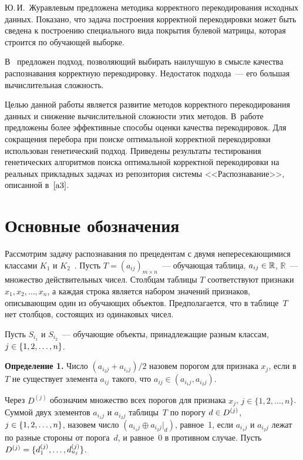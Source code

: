 \begin{multicols}{2}
Ю.\,И.~Журавлевым предложена методика корректного перекодирования
исходных данных. Показано, что задача построения корректной
перекодировки может быть сведена к построению специаль\-но\-го вида
покрытия булевой матрицы, которая строится по обучающей выборке. 

В~\cite{a1,a2} предложен подход, позволяющий выбирать наилучшую в
смысле качества распознавания корректную перекодировку. Недостаток
подхода~--- его большая вычислительная сложность.

Целью данной работы является развитие методов корректного
перекодирования данных и снижение вычислительной сложности этих
методов. В~работе предложены более эффективные способы оценки
качества перекодировок. Для сокращения перебора при поиске
оптимальной корректной перекодировки использован генетический
подход. Приведены результаты тестирования генетических алгоритмов
поиска оптимальной корректной перекодировки на реальных прикладных
задачах из репозитория системы <<Распознавание>>, описанной в~$\cite{a3}$.

\section{Основные обозначения}

Рассмотрим задачу распознавания по прецедентам с двумя
непересекающимися классами $K_{1} $ и $K_{2}$~\cite{a4}. Пусть
$T=(a_{ij })_{m \times n}$~--- обучающая таб\-ли\-ца, $a_{ij} \hm\in
\mathbb{R}$, $\mathbb{R}$~--- множество действительных чисел.
Столбцам таблицы $T$ соответствуют признаки $x_1,x_2, \ldots ,x_n$, а
каждая строка является набором значений признаков, описывающим один
из обучающих объектов. Предполагается, что в таблице~$T$ нет
столбцов, состоящих из одинаковых чисел.

Пусть $S_{i_1}$ и $S_{i_2}$~--- обучающие объекты, принадлежащие
разным классам, $j\hm\in \{1,2,\ldots ,n\}$.

\smallskip

\noindent
\textbf{Определение 1.} Число $(a_{i_{2}j} + {a_{i_{1}j}})/2$
назовем порогом для признака $x_j$, если в $T$ не существует
элемента $a_{ij}$ такого, что $a_{ij} \in (a_{i_{1}j}, a_{i_{2}j})$.

\smallskip

Через $D^{(j)}$ обозначим множество всех порогов для признака $x_j$,
$j\in \{1,2,\ldots ,n\}$. Суммой двух элементов $a_{i_{1}j}$ и
$a_{i_{2}j}$ таб\-ли\-цы~$T$ по порогу $d \hm\in D^{(j)}$,
$j\hm\in\{1,2,\ldots ,n\}$, назовем число $(a_{i_1j}\oplus a_{i_2j}|_d)$,
равное~1, если $a_{i_{1}j}$ и $a_{i_{2}j}$ лежат по разные стороны
от порога~$d$, и равное~0 в противном случае. Пусть
$D^{(j)}\hm=\{d^{(j)}_1,\ldots ,d^{(j)}_{u_j}\}$.


\end{multicols}
